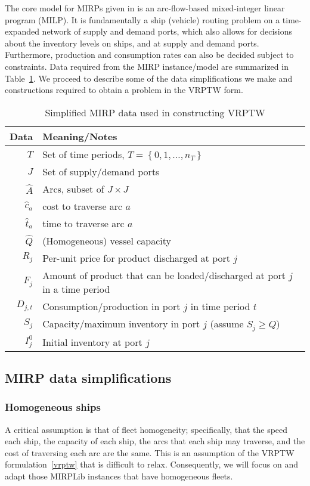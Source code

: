 \documentclass[11pt]{article}
\theoremstyle{definition}
\newcommand{\set}[1]{\left\{ #1 \right\}}
\newcommand{\0}{\mathbf{0}}
\renewcommand{\hat}{\widehat}
\begin{document}
The core model for MIRPs given in \cite{mirplib} is an arc-flow-based mixed-integer linear program (MILP).
It is fundamentally a ship (vehicle) routing problem on a time-expanded network of supply and demand ports, which also allows for decisions about the inventory levels on ships, and at supply and demand ports.
Furthermore, production and consumption rates can also be decided subject to constraints.
Data required from the MIRP instance/model are summarized in Table~\ref{tab:MIRPdata}.
We proceed to describe some of the data simplifications we make and constructions required to obtain a problem in the VRPTW form.

\begin{table}
\caption{Simplified MIRP data used in constructing VRPTW}
\label{tab:MIRPdata}
\begin{center}
\begin{tabular}{r | l}
\hline
Data & Meaning/Notes \\
\hline
$T$			& Set of time periods, $T = \set{0,1,\dots, n_T}$\\
$J$ 		& Set of supply/demand ports \\
$\hat{A}$	& Arcs, subset of $J \times J$ \\
$\hat{c}_a$	& cost to traverse arc $a$ \\
$\hat{t}_a$	& time to traverse arc $a$ \\
$\hat{Q}$	& (Homogeneous) vessel capacity \\
$R_j$		& Per-unit price for product discharged at port $j$ \\
$F_j$ 	  	& Amount of product that can be loaded/discharged at port $j$ in a time period\\
$D_{j,t}$	& Consumption/production in port $j$ in time period $t$\\
$S_j$		& Capacity/maximum inventory in port $j$ (assume $S_j \ge \hat{Q}$) \\
$I_j^0$		& Initial inventory at port $j$ \\
\hline
\end{tabular}
\end{center}
\end{table}

\subsection{MIRP data simplifications}

\subsubsection*{Homogeneous ships}
A critical assumption is that of fleet homogeneity;
specifically, that the speed each ship, the capacity of each ship, the arcs that each ship may traverse, and the cost of traversing each arc are the same.
This is an assumption of the VRPTW formulation~\eqref{vrptw} that is difficult to relax.
Consequently, we will focus on and adapt those MIRPLib instances that have homogeneous fleets.
\end{document}
